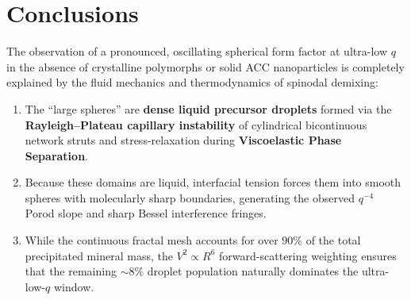 \documentclass[11pt,a4paper]{article}
\begin{document}
\section{Conclusions}

The observation of a pronounced, oscillating spherical form factor at ultra-low $q$ in the absence of crystalline polymorphs or solid ACC nanoparticles is completely explained by the fluid mechanics and thermodynamics of spinodal demixing:
\begin{enumerate}
    \item The ``large spheres'' are \textbf{dense liquid precursor droplets} formed via the \textbf{Rayleigh--Plateau capillary instability} of cylindrical bicontinuous network struts and stress-relaxation during \textbf{Viscoelastic Phase Separation}.
    \item Because these domains are liquid, interfacial tension forces them into smooth spheres with molecularly sharp boundaries, generating the observed $q^{-4}$ Porod slope and sharp Bessel interference fringes.
    \item While the continuous fractal mesh accounts for over \textbf{$90\%$} of the total precipitated mineral mass, the $V^2 \propto R^6$ forward-scattering weighting ensures that the remaining \textbf{$\sim 8\%$} droplet population naturally dominates the ultra-low-$q$ window.
\end{enumerate}



\end{document}
